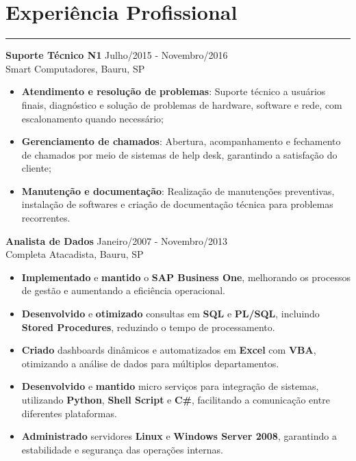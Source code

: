 \documentclass[10pt]{article}
\begin{document}
\section*{Experiência Profissional}
\vspace{-15pt}
\rule{\linewidth}{1pt}

{\bf Suporte Técnico N1} \hfill  Julho/2015 - Novembro/2016\\
Smart Computadores, Bauru, SP

\begin{itemize} \itemsep -2pt %
    \item \textbf{Atendimento e resolução de problemas}: Suporte técnico a usuários finais, diagnóstico e solução de problemas de hardware, software e rede, com escalonamento quando necessário;

    \item \textbf{Gerenciamento de chamados}: Abertura, acompanhamento e fechamento de chamados por meio de sistemas de help desk, garantindo a satisfação do cliente;

    \item \textbf{Manutenção e documentação}: Realização de manutenções preventivas, instalação de softwares e criação de documentação técnica para problemas recorrentes.
\end{itemize}

{\bf Analista de Dados} \hfill  Janeiro/2007 - Novembro/2013\\
Completa Atacadista, Bauru, SP

\begin{itemize} \itemsep -2pt %
    \item \textbf{Implementado} e \textbf{mantido} o \textbf{SAP Business One}, melhorando os processos de gestão e aumentando a eficiência operacional.

    \item \textbf{Desenvolvido} e \textbf{otimizado} consultas em \textbf{SQL} e \textbf{PL/SQL}, incluindo \textbf{Stored Procedures}, reduzindo o tempo de processamento.

    \item \textbf{Criado} dashboards dinâmicos e automatizados em \textbf{Excel} com \textbf{VBA}, otimizando a análise de dados para múltiplos departamentos.

    \item \textbf{Desenvolvido} e \textbf{mantido} micro serviços para integração de sistemas, utilizando \textbf{Python}, \textbf{Shell Script} e \textbf{C\#}, facilitando a comunicação entre diferentes plataformas.

    \item \textbf{Administrado} servidores \textbf{Linux} e \textbf{Windows Server 2008}, garantindo a estabilidade e segurança das operações internas.
\end{itemize}
\end{document}
